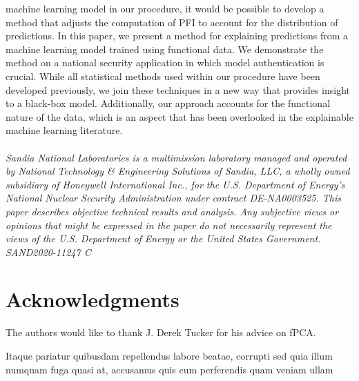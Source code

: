 \documentclass[letterpaper]{article}
\begin{document}
machine learning model in our procedure, it would be possible to develop a method that adjusts the computation of PFI to account for the distribution of predictions.  In this paper, we present a method for explaining predictions from a machine learning model trained using functional data. We demonstrate the method on a national security application in which model authentication is crucial. While all statistical methods used within our procedure have been developed previously, we join these techniques in a new way that provides insight to a black-box model. Additionally, our approach accounts for the functional nature of the data, which is an aspect that has been overlooked in the explainable machine learning literature.\\
\\
\textit{Sandia National Laboratories is a multimission laboratory managed and operated by National Technology \& Engineering Solutions of Sandia, LLC, a wholly owned subsidiary of Honeywell International Inc., for the U.S. Department of Energy's National Nuclear Security Administration under contract DE-NA0003525. This paper describes objective technical results and analysis. Any subjective views or opinions that might be expressed in the paper do not necessarily represent the views of the U.S. Department of Energy or the United States Government. SAND2020-11247 C}

\vspace{-3.08mm}
\section*{Acknowledgments}

The authors would like to thank J. Derek Tucker for his advice on fPCA.

  Itaque pariatur quibusdam repellendus labore beatae, corrupti sed quia illum numquam fuga quasi at, accusamus quis cum perferendis quam veniam ullam

\end{document}

